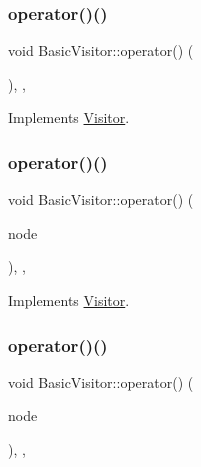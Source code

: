 \subsubsection{\texorpdfstring{operator()()}{operator()()}\hspace{0.1cm}{\footnotesize\ttfamily [48/60]}}
{\footnotesize\ttfamily void Basic\+Visitor\+::operator() (\begin{DoxyParamCaption}\item[{const \hyperlink{struct_property_name}{Property\+Name} \&}]{ }\end{DoxyParamCaption})\hspace{0.3cm}{\ttfamily [inline]}, {\ttfamily [override]}, {\ttfamily [virtual]}}



Implements \hyperlink{struct_visitor_a51d8b1d3dafa5d6a7d878673a2c4f9a8}{Visitor}.

\mbox{\label{struct_basic_visitor_a3a868dc82a76118467f3a1ae4b1c92cd}} 
\subsubsection{\texorpdfstring{operator()()}{operator()()}\hspace{0.1cm}{\footnotesize\ttfamily [49/60]}}
{\footnotesize\ttfamily void Basic\+Visitor\+::operator() (\begin{DoxyParamCaption}\item[{const \hyperlink{struct_property_assignment}{Property\+Assignment} \&}]{node }\end{DoxyParamCaption})\hspace{0.3cm}{\ttfamily [inline]}, {\ttfamily [override]}, {\ttfamily [virtual]}}



Implements \hyperlink{struct_visitor_a698c9aa4b47188061f156fe58c148d55}{Visitor}.

\mbox{\label{struct_basic_visitor_a8fecced7470cc28d2294c93e7df7ac1d}} 
\subsubsection{\texorpdfstring{operator()()}{operator()()}\hspace{0.1cm}{\footnotesize\ttfamily [50/60]}}
{\footnotesize\ttfamily void Basic\+Visitor\+::operator() (\begin{DoxyParamCaption}\item[{const \hyperlink{struct_arguments}{Arguments} \&}]{node }\end{DoxyParamCaption})\hspace{0.3cm}{\ttfamily [inline]}, {\ttfamily [override]}, {\ttfamily [virtual]}}



